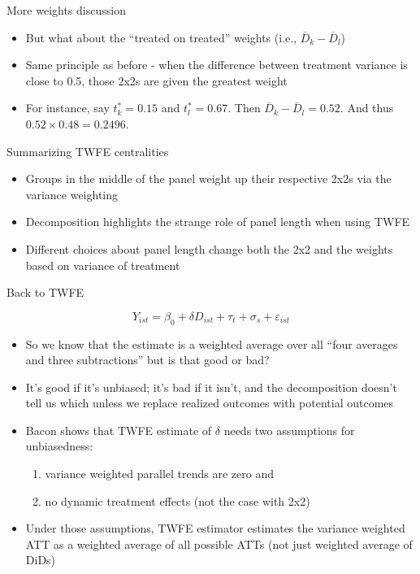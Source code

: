 \documentclass{beamer}
\begin{document}
\begin{frame}{More weights discussion}

\begin{itemize}
\item But what about the ``treated on treated'' weights (i.e., $\overline{D}_k - \overline{D}_{l} $)  
\item Same principle as before - when the difference between treatment variance is close to 0.5, those 2x2s are given the greatest weight
\item For instance, say $t^*_k=0.15$ and $t^*_l=0.67$. Then $\overline{D}_k - \overline{D}_{l} = 0.52$.  And thus $0.52 \times 0.48 = 0.2496$.
\end{itemize}

\end{frame}


\begin{frame}{Summarizing TWFE centralities}

\begin{itemize}
\item Groups in the middle of the panel weight up their respective 2x2s via the variance weighting
\item Decomposition highlights the strange role of panel length when using TWFE
\item Different choices about panel length change both the 2x2 and the weights based on variance of treatment
\end{itemize}

\end{frame}




\begin{frame}{Back to TWFE}


$$Y_{ist} = \beta_0 + \delta D_{ist} + \tau_t + \sigma_s + \varepsilon_{ist}$$


\begin{itemize}

\item So we know that the estimate is a weighted average over all ``four averages and three subtractions'' but is that good or bad?
\item It's good if it's unbiased; it's bad if it isn't, and the decomposition doesn't tell us which unless we replace realized outcomes with potential outcomes
\item Bacon shows that TWFE estimate of $\delta$ needs two assumptions for unbiasedness:
	\begin{enumerate}
	\item variance weighted parallel trends are zero and 
	\item no dynamic treatment effects (not the case with 2x2)
	\end{enumerate}
\item Under those assumptions, TWFE estimator estimates the variance weighted ATT as a weighted average of all possible ATTs (not just weighted average of DiDs)

\end{itemize}

\end{frame}
\end{document}
